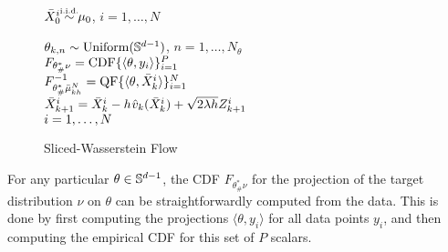 \begin{wrapfigure}{R}{0.52\textwidth}
\vspace{-15pt}
    \begin{minipage}{0.52\textwidth}
     \begin{algorithm2e} [H]
		 \SetInd{0.1ex}{1.5ex}
		 \DontPrintSemicolon
		 {\color{purple} \small {}}
		 $\bar{X}_0^i \simiid \mu_0$, \hfill $i = 1,\dots,N$ \\
     {
		    {\color{purple} \small {}}
		    $\theta_{k,n} \sim \mathrm{Uniform}(\mathbb{S}^{d-1})$, \hfill $n = 1,\dots,N_\theta$\\
        {
        {\color{purple} \small {}}
        $F_{\theta^*_\#\nu}=\textnormal{CDF}\{\langle\theta,y_i\rangle\}_{i=1}^P$\\
        {\color{purple} \small {}}
        $F^{-1}_{\theta^*_\#\bar{\mu}_{kh}^{N}}=\textnormal{QF}\{\langle\theta,\bar{X}_k^i\rangle\}_{i=1}^N$\\
        }
        {\color{purple} \small {}}
        $\bar{X}_{k+1}^i = \bar{X}_{k}^i - h \hspace{0.5pt} \hat{v}_k(\bar{X}^i_k) + \sqrt{2 \lambda h} Z^i_{k+1}$ \vspace{2pt} \\
        $\hfill i = 1,\dots,N$

		 }
		 \caption{Sliced-Wasserstein Flow}
		 \label{algo:flow}
	 \end{algorithm2e}
\end{minipage}
\vspace{-20pt}
\end{wrapfigure}

For any particular $\theta\in\mathbb{S}^{d-1}$, the CDF $F_{\theta^*_\#\nu}$ for the projection of the target distribution $\nu$ on $\theta$ can be straightforwardly computed from the data. This is done by first computing the projections $\langle \theta, y_i\rangle$ for all data points $y_i$, and then computing the empirical CDF for this set of $P$ scalars.

